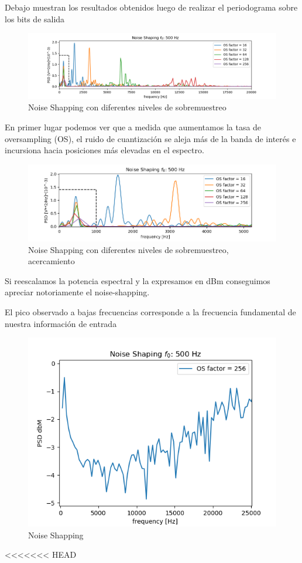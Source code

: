 Debajo muestran los resultados obtenidos luego de realizar el periodograma sobre los bits de salida

\begin{figure}[H]
	\centering
	\includegraphics[width=\linewidth]{ImagenesEjercicio2/NoiseShappingDemo1zoom2solid.png}
	\caption{Noise Shapping con diferentes niveles de sobremuestreo}
	\label{fig:noiseshappingdemo1}
\end{figure}
En primer lugar podemos ver que a medida que aumentamos la tasa de oversampling (OS), el ruido de cuantización se aleja más de la banda de interés e incursiona hacia posiciones más elevadas en el espectro.

\begin{figure}[H]
	\centering
	\includegraphics[width=\linewidth]{ImagenesEjercicio2/NoiseShappingSolidZoom.png}
	\caption{Noise Shapping con diferentes niveles de sobremuestreo, acercamiento}
	\label{fig:noiseshappingdemo1}
\end{figure}

Si reescalamos la potencia espectral y la expresamos en dBm conseguimos apreciar notoriamente el noise-shapping.

El pico observado a bajas frecuencias corresponde a la frecuencia fundamental de nuestra información de entrada
\begin{figure}[H]
	\centering
	\includegraphics[scale=0.7]{ImagenesEjercicio2/NoiseShappingdbM.png}
	\caption{Noise Shapping}
	\label{fig:noiseshappingdemo1}
\end{figure}
<<<<<<< HEAD

